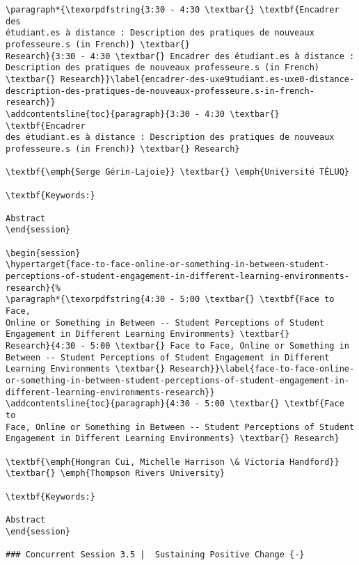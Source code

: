 \documentclass[
]{book}
\begin{document}
\begin{verbatim}
\paragraph*{\texorpdfstring{3:30 - 4:30 \textbar{} \textbf{Encadrer des
étudiant.es à distance : Description des pratiques de nouveaux
professeure.s (in French)} \textbar{}
Research}{3:30 - 4:30 \textbar{} Encadrer des étudiant.es à distance : Description des pratiques de nouveaux professeure.s (in French) \textbar{} Research}}\label{encadrer-des-uxe9tudiant.es-uxe0-distance-description-des-pratiques-de-nouveaux-professeure.s-in-french-research}}
\addcontentsline{toc}{paragraph}{3:30 - 4:30 \textbar{} \textbf{Encadrer
des étudiant.es à distance : Description des pratiques de nouveaux
professeure.s (in French)} \textbar{} Research}

\textbf{\emph{Serge Gérin-Lajoie}} \textbar{} \emph{Université TÉLUQ}

\textbf{Keywords:}

Abstract
\end{session}

\begin{session}
\hypertarget{face-to-face-online-or-something-in-between-student-perceptions-of-student-engagement-in-different-learning-environments-research}{%
\paragraph*{\texorpdfstring{4:30 - 5:00 \textbar{} \textbf{Face to Face,
Online or Something in Between -- Student Perceptions of Student
Engagement in Different Learning Environments} \textbar{}
Research}{4:30 - 5:00 \textbar{} Face to Face, Online or Something in Between -- Student Perceptions of Student Engagement in Different Learning Environments \textbar{} Research}}\label{face-to-face-online-or-something-in-between-student-perceptions-of-student-engagement-in-different-learning-environments-research}}
\addcontentsline{toc}{paragraph}{4:30 - 5:00 \textbar{} \textbf{Face to
Face, Online or Something in Between -- Student Perceptions of Student
Engagement in Different Learning Environments} \textbar{} Research}

\textbf{\emph{Hongran Cui, Michelle Harrison \& Victoria Handford}}
\textbar{} \emph{Thompson Rivers University}

\textbf{Keywords:}

Abstract
\end{session}

### Concurrent Session 3.5 |  Sustaining Positive Change {-}


\end{verbatim}
\end{document}
